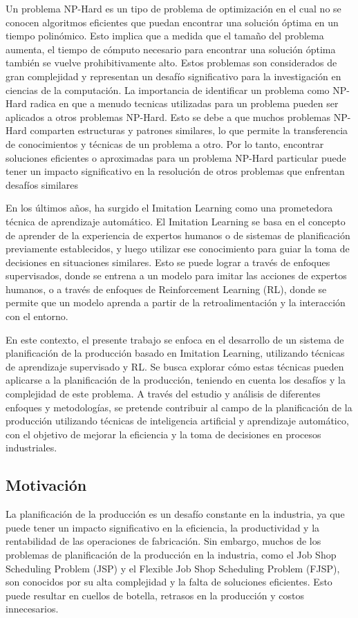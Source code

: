 Un problema NP-Hard es un tipo de problema de optimización en el cual no se conocen algoritmos 
eficientes que puedan encontrar una solución óptima en un tiempo polinómico. Esto implica que a 
medida que el tamaño del problema aumenta, el tiempo de cómputo necesario para encontrar una 
solución óptima también se vuelve prohibitivamente alto. Estos problemas son considerados de 
gran complejidad y representan un desafío significativo para la investigación en ciencias de 
la computación. La importancia de identificar un problema como NP-Hard radica en que a menudo 
tecnicas utilizadas para un problema pueden ser aplicados a otros problemas NP-Hard. Esto se debe a que 
muchos problemas NP-Hard comparten estructuras y patrones similares, lo que permite la 
transferencia de conocimientos y técnicas de un problema a otro. Por lo tanto, encontrar 
soluciones eficientes o aproximadas para un problema NP-Hard particular puede tener un impacto 
significativo en la resolución de otros problemas que enfrentan desafíos similares\medskip

En los últimos años, ha surgido el Imitation Learning como una prometedora técnica de aprendizaje 
automático. El Imitation Learning se basa en el concepto de aprender de la experiencia de expertos 
humanos o de sistemas de planificación previamente establecidos, y luego utilizar ese conocimiento para 
guiar la toma de decisiones en situaciones similares. Esto se puede lograr a través de enfoques 
supervisados, donde se entrena a un modelo para imitar las acciones de expertos humanos, o 
a través de enfoques de Reinforcement Learning (RL), donde se permite que un modelo aprenda a 
partir de la retroalimentación y la interacción con el entorno.\medskip

En este contexto, el presente trabajo se enfoca en el desarrollo de un sistema de planificación 
de la producción basado en Imitation Learning, utilizando técnicas de aprendizaje supervisado y RL. 
Se busca explorar cómo estas técnicas pueden aplicarse a la planificación de la producción, teniendo 
en cuenta los desafíos y la complejidad de este problema. A través del estudio y análisis de 
diferentes enfoques y metodologías, se pretende contribuir al campo de la planificación de la 
producción utilizando técnicas de inteligencia artificial y aprendizaje automático, con el objetivo 
de mejorar la eficiencia y la toma de decisiones en procesos industriales.\medskip

\subsection{Motivación}
La planificación de la producción es un desafío constante en la industria, ya que puede tener 
un impacto significativo en la eficiencia, la productividad y la rentabilidad de las operaciones 
de fabricación. Sin embargo, muchos de los problemas de planificación de la producción en la 
industria, como el Job Shop Scheduling Problem (JSP) y el Flexible Job Shop Scheduling Problem (FJSP), 
son conocidos por su alta complejidad y la falta de soluciones eficientes. Esto puede resultar 
en cuellos de botella, retrasos en la producción y costos innecesarios.\medskip

